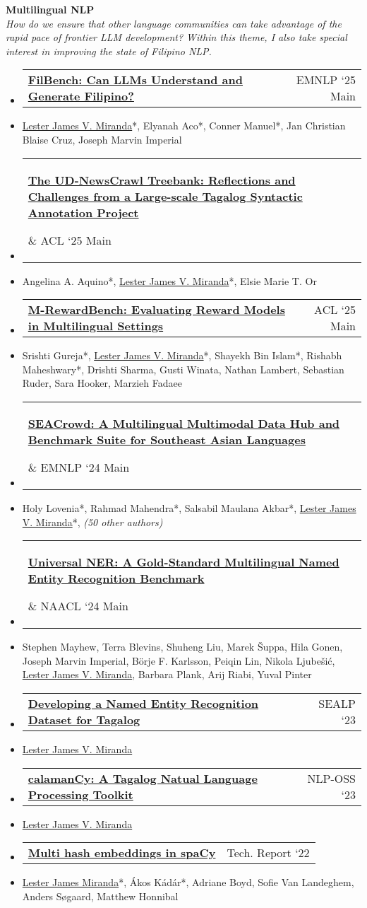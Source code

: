\documentclass[a4paper,11pt]{article}
\makeatletter
\newcommand{\resumeItem}[1]{
  \item\small{
    {#1 \vspace{-2pt}}
  }
}
\newcommand{\resumeProjectHeading}[2]{
    \item
    \begin{tabular*}{0.97\textwidth}{l@{\extracolsep{\fill}}r}
      \small#1 & #2 \\
    \end{tabular*}\vspace{-7pt}
}
\newcommand{\resumeSubHeadingListStart}{\begin{itemize}[leftmargin=0.15in, label={}]}
\newcommand{\resumeSubHeadingListEnd}{\end{itemize}}
\makeatother
\begin{document}
\vspace{0.1em}
\textbf{Multilingual NLP}\\
\textit{\small How do we ensure that other language communities can take advantage of the rapid pace of frontier LLM development? Within this theme, I also take special interest in improving the state of Filipino NLP.}
\resumeSubHeadingListStart
\resumeProjectHeading
{\href{https://arxiv.org/abs/2508.03523}{\textbf{FilBench: Can LLMs Understand and Generate Filipino?}}}{\small EMNLP `25 Main}
\resumeItem{\underline{Lester James V. Miranda}*, Elyanah Aco*, Conner Manuel*, Jan Christian Blaise Cruz, Joseph Marvin Imperial}
\resumeProjectHeading
{\parbox{0.80\textwidth}{\href{https://aclanthology.org/2025.acl-long.357/}{\textbf{The UD-NewsCrawl Treebank: Reflections and Challenges from a Large-scale Tagalog Syntactic Annotation Project}}}}{\small ACL `25 Main}
\resumeItem{Angelina A. Aquino*, \underline{Lester James V. Miranda}*, Elsie Marie T. Or}
\resumeProjectHeading
{\href{https://aclanthology.org/2025.acl-long.3/}{\textbf{M-RewardBench: Evaluating Reward Models in Multilingual Settings}}}{\small ACL `25 Main}
\resumeItem{Srishti Gureja*, \underline{Lester James V. Miranda}*, Shayekh Bin Islam*, Rishabh Maheshwary*, Drishti Sharma, Gusti Winata, Nathan Lambert, Sebastian Ruder, Sara Hooker, Marzieh Fadaee}
\resumeProjectHeading
{\parbox{0.80\textwidth}{\href{https://aclanthology.org/2024.emnlp-main.296/}{\textbf{SEACrowd: A Multilingual Multimodal Data Hub and Benchmark Suite for Southeast Asian Languages}}}}{\small EMNLP `24 Main}
\resumeItem{Holy Lovenia*, Rahmad Mahendra*, Salsabil Maulana Akbar*, \underline{Lester James V. Miranda}*, \textit{(50 other authors)}}
\resumeProjectHeading
{\parbox{0.70\textwidth}{\href{https://aclanthology.org/2024.naacl-long.243/}{\textbf{Universal NER: A Gold-Standard Multilingual Named Entity Recognition Benchmark}}}}{\small NAACL `24 Main}
\resumeItem{Stephen Mayhew, Terra Blevins, Shuheng Liu, Marek Šuppa, Hila Gonen, Joseph Marvin Imperial, Börje F. Karlsson, Peiqin Lin, Nikola Ljubešić, \underline{Lester James V. Miranda}, Barbara Plank, Arij Riabi, Yuval Pinter}
\resumeProjectHeading
{\href{https://aclanthology.org/2023.sealp-1.2/}{\textbf{Developing a Named Entity Recognition Dataset for Tagalog}}}{\small SEALP `23}
\resumeItem{\underline{Lester James V. Miranda}}
\resumeProjectHeading
{\href{https://aclanthology.org/2023.nlposs-1.1/}{\textbf{calamanCy: A Tagalog Natual Language Processing Toolkit}}}{\small NLP-OSS `23}
\resumeItem{\underline{Lester James V. Miranda}}
\resumeProjectHeading
{\href{https://arxiv.org/abs/2212.09255}{\textbf{Multi hash embeddings in spaCy}}}{\small Tech. Report `22}
\resumeItem{\underline{Lester James Miranda}*, Ákos Kádár*, Adriane Boyd, Sofie Van Landeghem, Anders Søgaard, Matthew Honnibal}
\resumeSubHeadingListEnd
\end{document}
